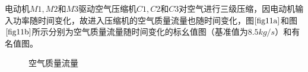 \documentclass{jnuthesis}
\begin{document}
	\par 电动机$ M1,M2 $和$ M3 $驱动空气压缩机$ C1,C2 $和$ C3 $对空气进行三级压缩，因电动机输入功率随时间变化，故进入压缩机的空气质量流量也随时间变化，图$ \fontsize{10.5bp}{10pt}\ref{fig11a} $和图$ \fontsize{10.5bp}{10pt}\ref{fig11b} $所示分别为空气质量流量随时间变化的标幺值图（基准值为$ 8.5kg/s $）和有名值图。\\
	\begin{figure}[H]
		\caption{\fontsize{10.5bp}{10pt}空气质量流量} %
		\label{fig:11}  %
	\end{figure}
	
\end{document}
